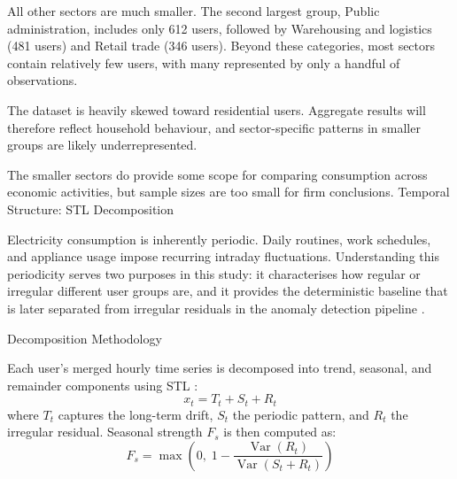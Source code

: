 ﻿\documentclass[12pt,reqno, twoside]{amsbook}
\makeatletter
\numberwithin{figure}{chapter}
\numberwithin{table}{chapter}
\numberwithin{equation}{chapter}
\def\section{\@startsection{section}{1}%
      \z@{.5\linespacing\@plus.7\linespacing}{.25\linespacing}%
      {\normalfont\bfseries\flushleft}}
\def\subsection{\@startsection{subsection}{2}%
      \z@{.5\linespacing\@plus.7\linespacing}{.25\linespacing}%
      {\normalfont\bfseries\flushleft}}
\theoremstyle{plain}
\numberwithin{equation}{chapter}
\numberwithin{section}{chapter}
\makeatother
\begin{document}
All other sectors are much smaller. The second largest group, Public administration, includes only 612 users, followed by Warehousing and logistics (481 users) and Retail trade (346 users). Beyond these categories, most sectors contain relatively few users, with many represented by only a handful of observations.

The dataset is heavily skewed toward residential users. Aggregate results will therefore reflect household behaviour, and sector-specific patterns in smaller groups are likely underrepresented.

The smaller sectors do provide some scope for comparing consumption across economic activities, but sample sizes are too small for firm conclusions.
\section{Temporal Structure: STL Decomposition}
\label{sec:stl}

\noindent Electricity consumption is inherently periodic. Daily routines, work schedules, and appliance usage impose recurring intraday fluctuations. Understanding this periodicity serves two purposes in this study: it characterises how regular or irregular different user groups are, and it provides the deterministic baseline that is later separated from irregular residuals in the anomaly detection pipeline \cite{m_z_h_unsupervised_2021, zangrando_anomaly_2022}.

\subsection{Decomposition Methodology}

Each user's merged hourly time series is decomposed into trend, seasonal, and remainder components using \ac{STL} \cite{cleveland_stl_1990}:
\begin{equation}
    x_t = T_t + S_t + R_t
    \label{eq:stl}
\end{equation}
where $T_t$ captures the long-term drift, $S_t$ the periodic pattern, and $R_t$ the irregular residual. Seasonal strength $F_s$ is then computed as:
\begin{equation}
    F_s = \max\!\left(0,\; 1 - \frac{\operatorname{Var}(R_t)}{\operatorname{Var}(S_t + R_t)}\right)
    \label{eq:seasonal_strength}
\end{equation}
\end{document}
